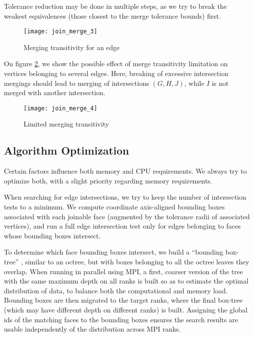 Tolerance reduction may be done in multiple steps, as we
try to break the weakest equivalences (those closest to
the merge tolerance bounds) first.

\begin{figure}[!h]
\centerline{
\texttt{[image: join\_merge\_3]}}
\caption{Merging transitivity for an edge}
\label{fig:algo.merging.pb_2}
\end{figure}

On figure \ref{fig:algo.merging.pb_3}, we show the possible
effect of merge transitivity limitation on vertices belonging to several edges.
Here, breaking of excessive intersection mergings should lead to
merging of intersections $(G, H, J)$, while $I$ is not merged
with another intersection.

\begin{figure}[!h]
\centerline{
\texttt{[image: join\_merge\_4]}}
\caption{Limited merging transitivity}
\label{fig:algo.merging.pb_3}
\end{figure}

\subsection*{Algorithm Optimization\label{sec:join.optim}}

Certain factors influence both memory and CPU requirements. We always
try to optimize both, with a slight priority regarding memory
requirements.

When searching for edge intersections, we try to keep the number of intersection
tests to a minimum. We compute coordinate axis-aligned bounding boxes associated
with each joinable face (augmented by the tolerance radii of associated
vertices), and run a full edge intersection test only for
edges belonging to faces whose bounding boxes intersect.

To determine which face bounding boxes intersect, we build a ``bounding
box-tree'' , similar to an octree, but with boxes belonging to all
the octree leaves they overlap. When running in parallel using MPI, a first,
coarser version of the tree with the same maximum depth on all ranks is built
so as to estimate the optimal distribution of data, to balance both the computational
and memory load. Bounding boxes are then migrated to the target ranks,
where the final box-tree (which may have different depth on different ranks)
is built. Assigning the global ids of the matching faces to the bounding boxes
ensures the search results are usable independently of the distribution
across MPI ranks.

